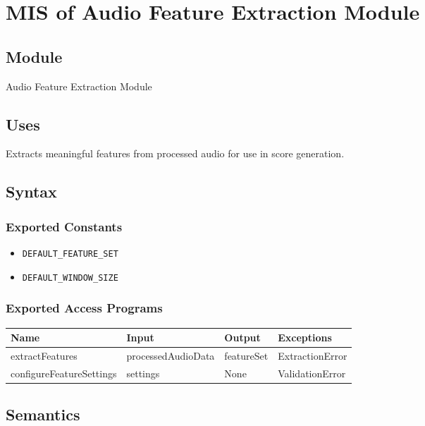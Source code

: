 \documentclass[12pt, titlepage]{article}
\begin{document}
\section{MIS of Audio Feature Extraction Module} \label{M5}  

\subsection{Module}  
Audio Feature Extraction Module  

\subsection{Uses}  
Extracts meaningful features from processed audio for use in score generation.  

\subsection{Syntax}  

\subsubsection{Exported Constants}  
\begin{itemize}
    \item \texttt{DEFAULT\_FEATURE\_SET}  
    \item \texttt{DEFAULT\_WINDOW\_SIZE}  
\end{itemize}  

\subsubsection{Exported Access Programs}  
\begin{center}  
\begin{tabular}{|p{4.5cm}|p{4cm}|p{2.5cm}|p{3cm}|}  
\hline  
\textbf{Name} & \textbf{Input} & \textbf{Output} & \textbf{Exceptions} \\  
\hline  
extractFeatures & processedAudioData & featureSet & ExtractionError \\  
configureFeatureSettings & settings & None & ValidationError \\  
\hline  
\end{tabular}  
\end{center}  

\subsection{Semantics}  
\end{document}
